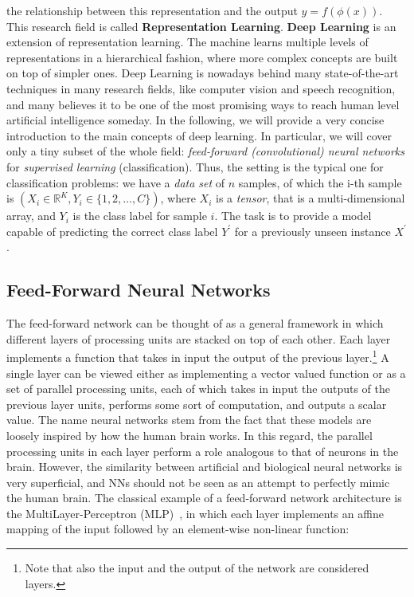 \documentclass[../main.tex]{subfiles}
\begin{document}
    the relationship between this representation and the output $y = f(\phi(x))$. This research field is called \textbf{Representation Learning}.
    \newline
    \textbf{Deep Learning} is an extension of representation learning. The machine learns multiple levels of representations
    in a hierarchical fashion, where more complex concepts are built on top of simpler ones.
    Deep Learning is nowadays behind many state-of-the-art techniques in many research fields, like computer vision and speech recognition,
    and many believes it to be one of the most promising ways to reach human level artificial intelligence someday.
    \newline
    In the following, we will provide a very concise introduction to the main concepts of deep learning. In particular, we will cover only a
    tiny subset of the whole field: \textit{feed-forward (convolutional) neural networks} for \textit{supervised learning} (classification).
	Thus, the setting is the typical one for classification problems: we have a \textit{data set} of $n$ samples, of which the i-th sample
	is $(X_{i} \in \mathbb{R}^{K}, Y_{i} \in \{1, 2, \ldots, C\})$, where $X_{i}$ is a \textit{tensor}, that is a multi-dimensional array, and $Y_{i}$
	is the class label for sample $i$. The task is to provide a model capable of predicting the correct class label $Y^{'}$ for a previously
	unseen instance $X^{'}$.

    \subsection{Feed-Forward Neural Networks}
    The feed-forward network can be thought of as a general framework in which different layers of processing units are stacked on top
    of each other. Each layer implements a function that takes in input the output of the previous layer.\footnote{Note that also the input and
    the output of the network are considered layers.} A single layer can be viewed either as implementing a vector valued function or
    as a set of parallel processing units, each of which takes in input the outputs of the previous layer units, performs some
    sort of computation, and outputs a scalar value. The name neural networks stem from the fact that these models are loosely inspired
    by how the human brain works. In this regard, the parallel processing units in each layer perform a role analogous
    to that of neurons in the brain. However, the similarity between artificial and biological neural networks is very superficial, and
    NNs should not be seen as an attempt to perfectly mimic the human brain.
    The classical example of a feed-forward network architecture is the MultiLayer-Perceptron (MLP)~\cite{mlp}, in which
    each layer implements an affine mapping of the input followed by an element-wise non-linear function:
\end{document}
